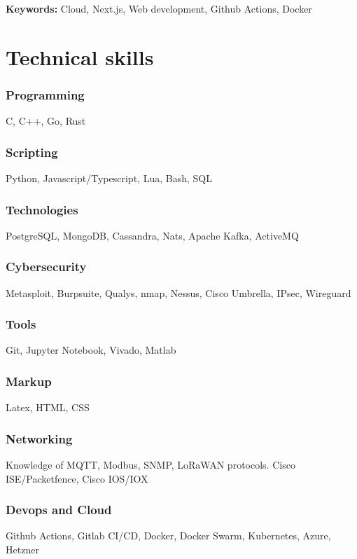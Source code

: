 \documentclass[11pt,a4paper]{article}
\begin{document}
  \textbf{Keywords:} Cloud, Next.js, Web development, Github Actions, Docker

  \section{Technical skills}
  \subsubsection{Programming}
  C, C++, Go, Rust

  \subsubsection{Scripting}
  Python, Javascript/Typescript, Lua, Bash, SQL

  \subsubsection{Technologies}
  PostgreSQL, MongoDB, Cassandra, Nats, Apache Kafka, ActiveMQ
  
  \subsubsection{Cybersecurity}
  Metasploit, Burpsuite, Qualys, nmap, Nessus, Cisco Umbrella, IPsec, Wireguard

  \subsubsection{Tools}
  Git, Jupyter Notebook, Vivado, Matlab 

  \subsubsection{Markup}
  Latex, HTML, CSS

  \subsubsection{Networking}
  Knowledge of MQTT, Modbus, SNMP, LoRaWAN protocols. Cisco ISE/Packetfence, Cisco IOS/IOX

  \subsubsection{Devops and Cloud}
  Github Actions, Gitlab CI/CD, Docker, Docker Swarm, Kubernetes, Azure, Hetzner

\end{document}
